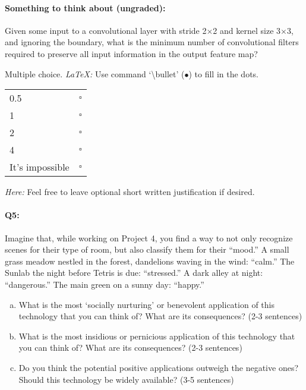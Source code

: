 \paragraph{Something to think about (ungraded):} Given some input to a convolutional layer with stride 2$\times$2 and kernel size 3$\times$3, and ignoring the boundary, what is the minimum number of convolutional filters required to preserve all input information in the output feature map?

Multiple choice. 
\emph{LaTeX:} Use command  `\textbackslash bullet' ($\bullet$) to fill in the dots.

\begin{tabular}[h]{lc}
\toprule
0.5 & $\square$ \\
1 & $\square$ \\
2 & $\square$ \\
4 & $\square$ \\
It's impossible & $\square$ \\
\bottomrule
\end{tabular}

\emph{Here:} Feel free to leave optional short written justification if desired.


\pagebreak
\paragraph{Q5:} 
Imagine that, while working on Project 4, you find a way to not only recognize scenes for their type of room, but also classify them for their ``mood.'' A small grass meadow nestled in the forest, dandelions waving in the wind: ``calm.'' The Sunlab the night before Tetris is due: ``stressed.'' A dark alley at night: ``dangerous.'' The main green on a sunny day: ``happy.''

\begin{enumerate}[(a)]
    \item 
    What is the most `socially nurturing' or benevolent application of this technology that you can think of? What are its consequences? (2-3 sentences)
    \item 
    What is the most insidious or pernicious application of this technology that you can think of? What are its consequences? (2-3 sentences)
    \item
    Do you think the potential positive applications outweigh the negative ones? Should this technology be widely available? (3-5 sentences)
\end{enumerate}

